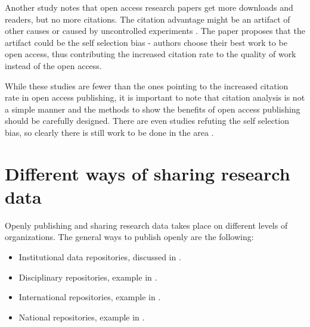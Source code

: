 Another study notes that open access research papers get more downloads and
readers, but no more citations. The citation advantage might be an artifact
of other causes or caused by uncontrolled experiments \cite{davis2008open}.
The paper proposes that the artifact could be the self selection bias - authors
choose their best work to be open access, thus contributing the increased
citation rate to the quality of work instead of the open access.

While these studies are fewer than the ones pointing to the increased citation
rate in open access publishing, it is important to note that citation analysis
is not a simple manner and the methods to show the benefits of open access
publishing should be carefully designed. There are even studies refuting the
self selection bias, so clearly there is still work to be done in the area
\cite{DBLP:journals/corr/abs-1001-0361}.

\section{Different ways of sharing research data}

Openly publishing and sharing research data takes place on different levels of
organizations. The general ways to publish openly are the following:

\begin{itemize}
    \item Institutional data repositories, discussed in \cite{cragin2010data}.
    \item Disciplinary repositories, example in \cite{DBLP:journals/nar/EdgarDL03}.
    \item International repositories, example in \cite{2013EGUGA..15.7202L}.
    \item National repositories, example in \cite{cimino2010clinical}.
\end{itemize}

